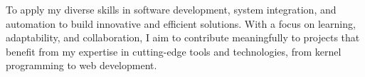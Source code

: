 \smallskip
{}
\label{Objective}
\begin{NexMainBox}[light, hdrA, sdwA, crnA, title=\textbf{Objective}, grwA]
	\begin{NexMainBox}
		To apply my diverse skills in software development, system integration, and automation to build innovative and efficient solutions. With a focus on learning, adaptability, and collaboration, I aim to contribute meaningfully to projects that benefit from my expertise in cutting-edge tools and technologies, from kernel programming to web development.
	\end{NexMainBox}
\end{NexMainBox}

